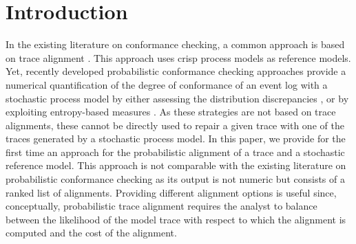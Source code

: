 \section{Introduction}


\label{introduction}
%
In the existing literature on conformance checking, a common approach is based on trace alignment \cite{DBLP:conf/edoc/AdriansyahDA11}. This approach uses crisp process models as reference models. Yet, recently developed probabilistic conformance checking approaches provide a numerical quantification of the degree of conformance
of an event log with a stochastic process model by either assessing the distribution discrepancies \cite{DBLP:conf/bpm/LeemansSA19}, or by exploiting entropy-based measures \cite{DBLP:conf/icpm/PolyvyanyyK19,DBLP:journals/tosem/PolyvyanyySWCM20}.
As these strategies are not based on trace alignments, these cannot be directly used to repair a given trace with one of the traces generated by a stochastic process model.
%
In this paper, we provide for the first time an approach for the probabilistic alignment of a trace and a stochastic reference
model. This approach is not comparable with the existing literature on probabilistic conformance checking as its output is not numeric but consists of a ranked list of alignments.
Providing different alignment options is useful since, conceptually, probabilistic trace alignment requires the analyst to
balance between the likelihood of the model trace with respect to which the alignment is computed and the cost of the alignment.

